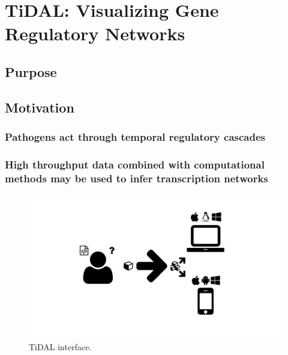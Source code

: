 \chapter{TiDAL: Visualizing Gene Regulatory Networks}

\section{Purpose}


\section{Motivation}
\subsection{Pathogens act through temporal regulatory cascades}
\subsection{High throughput data combined with computational methods may be used to infer transcription networks}

\begin{figure}
  \centering
  \includegraphics[width=\textwidth,page=17,trim=0.37cm .65cm 0.37cm 0.3cm, clip=true]{images/Figures.pdf}
  \caption{TiDAL interface.}
  \label{Figure:tidal-landing}
\end{figure}

